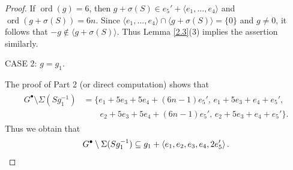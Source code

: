 \documentclass[10pt,a4paper]{amsart}
\DeclareMathOperator{\ord}{ord}
\begin{document}
\begin{proof}
If $\ord(g)=6$, then $g+\sigma (S) \in e_5'+\langle e_1,...,e_4\rangle$ and $\ord(g+ \sigma (S))=6n$. Since $\langle e_1,...,e_4\rangle \cap \langle g+\sigma (S) \rangle=\{0\}$ and $g\ne 0$, it follows that  $-g\notin \langle g+\sigma (S) \rangle$. Thus Lemma \ref{2.3}(3) implies the assertion similarly.


	
\smallskip
\noindent
CASE 2: $g=g_1$. 

The proof of Part 2 (or direct computation) shows that
	\begin{align*}
	\begin{aligned}
	G^{\bullet} \setminus \Sigma(Sg_1^{-1})
	&=
	\bigl\{
	e_1+5e_3+5e_4+(6n-1)e_5',\, e_1+5e_3+e_4+e_5',\\
	&\qquad e_2+5e_3+5e_4+(6n-1)e_5',\, e_2+5e_3+e_4+e_5'
	\bigr\}.
	\end{aligned}
	\end{align*}
Thus we obtain that
\[
	G^{\bullet} \setminus \Sigma(Sg_1^{-1})\subseteq
	g_1 + \langle e_1,e_2,e_3, e_4,2e_5' \rangle \,. \qedhere
\]
\end{proof}
\end{document}
